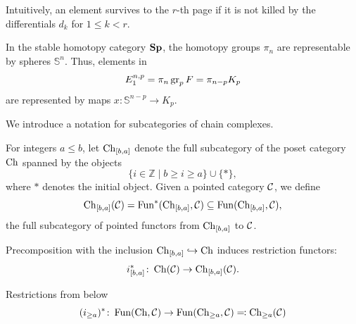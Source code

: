 Intuitively, an element survives to the $r$-th page if it is not killed by the differentials $d_k$ for $1 \leq k < r$.

\begin{rem}\label{rem:FirstPageDesc}
    In the stable homotopy category $\mathbf{Sp}$, the homotopy groups $\pi_n$ are representable by spheres $\mathbb{S}^n$. Thus, elements in
    \begin{equation*}
        E_1^{n,p} = \pi_n \operatorname{gr}_p F = \pi_{n - p} K_p
    \end{equation*}
    are represented by maps $x\colon \mathbb{S}^{n - p} \to K_p$.
\end{rem}

We introduce a notation for subcategories of chain complexes.

\begin{defn}\label{def:Ch_n}
    For integers $a \leq b$, let $\operatorname{Ch}_{[b,a]}$ denote the full subcategory of the poset category $\operatorname{Ch}$ spanned by the objects
    \begin{equation}
        \{ i \in \mathbb{Z} \mid b \geq i \geq a \} \cup \{ * \},
    \end{equation}
    where $*$ denotes the initial object. Given a pointed category $\mathcal{C}$, we define
    \begin{equation}
        \operatorname{Ch}_{[b,a]}(\mathcal{C}) = \operatorname{Fun}^*(\operatorname{Ch}_{[b,a]}, \mathcal{C}) \subseteq \operatorname{Fun}(\operatorname{Ch}_{[b,a]}, \mathcal{C}),
    \end{equation}
    the full subcategory of pointed functors from $\operatorname{Ch}_{[b,a]}$ to $\mathcal{C}$.
\end{defn}

Precomposition with the inclusion $\operatorname{Ch}_{[b,a]} \hookrightarrow \operatorname{Ch}$ induces restriction functors:
\begin{equation*}
    i_{[b,a]}^* \colon \operatorname{Ch}(\mathcal{C}) \to \operatorname{Ch}_{[b,a]}(\mathcal{C}).
\end{equation*}

Restrictions from below
\begin{equation}\label{eq:res_from_below}
    (i_{\geq a})^* \colon \operatorname{Fun}(\operatorname{Ch}, \mathcal{C}) \to \operatorname{Fun}(\operatorname{Ch}_{\geq a}, \mathcal{C}) \eqcolon \operatorname{Ch}_{\geq a}(\mathcal{C})
\end{equation}

